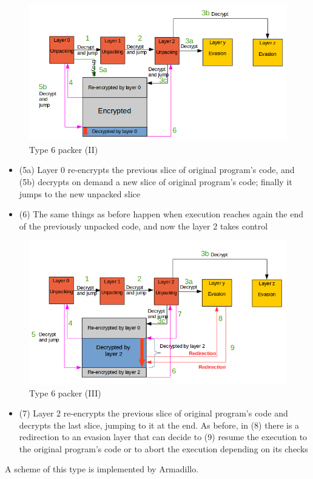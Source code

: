 \begin{figure}[!ht]
	\begin{center}
		\includegraphics[width=\textwidth]{pictures/packer_type_6-1.png}
	\end{center}
	\caption{Type 6 packer (II)}
\end{figure}
\begin{itemize}
\item (5a) Layer 0 re-encrypts the previous slice of original program's code, and (5b) decrypts on demand a new slice of original program's code; finally it jumps to the new unpacked slice
\item (6) The same things as before happen when execution reaches again the end of the previously unpacked code, and now the layer 2 takes control
\end{itemize}
\begin{figure}[!ht]
	\begin{center}
		\includegraphics[width=\textwidth]{pictures/packer_type_6-2.png}
	\end{center}
	\caption{Type 6 packer (III)}
\end{figure}
\begin{itemize}
\item (7) Layer 2 re-encrypts the previous slice of original program's code and decrypts the last slice, jumping to it at the end. As before, in (8) there is a redirection to an evasion layer that can decide to (9) resume the execution to the original program's code or to abort the execution depending on its checks
\end{itemize}
A scheme of this type is implemented by Armadillo.

